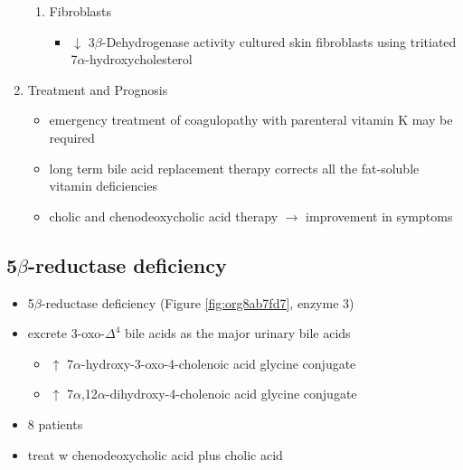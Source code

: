 \documentclass{scrartcl}
\begin{document}
\begin{enumerate}
\begin{enumerate}
\item Fibroblasts
\label{sec:orgb903493}
\begin{itemize}
\item \(\downarrow\) 3\(\beta\)-Dehydrogenase activity cultured skin fibroblasts using
tritiated 7\(\alpha\)-hydroxycholesterol
\end{itemize}
\end{enumerate}

\item Treatment and Prognosis
\label{sec:org1146d0d}
\begin{itemize}
\item emergency treatment of coagulopathy with parenteral vitamin K may be required
\item long term bile acid replacement therapy corrects all the fat-soluble
vitamin deficiencies

\item cholic and chenodeoxycholic acid therapy \(\to\) improvement in symptoms
\end{itemize}
\end{enumerate}

\subsection{5\(\beta\)-reductase deficiency}
\label{sec:org57f70bf}
\begin{itemize}
\item 5\(\beta\)-reductase deficiency (Figure \ref{fig:org8ab7fd7}, enzyme 3)
\item excrete 3-oxo-\(\Delta^{\text{4}}\) bile acids as the major urinary bile acids
\begin{itemize}
\item \(\uparrow\) 7\(\alpha\)-hydroxy-3-oxo-4-cholenoic acid glycine conjugate
\item \(\uparrow\) 7\(\alpha\),12\(\alpha\)-dihydroxy-4-cholenoic acid glycine conjugate
\end{itemize}
\item 8 patients
\item treat w chenodeoxycholic acid plus cholic acid
\end{itemize}
\end{document}
